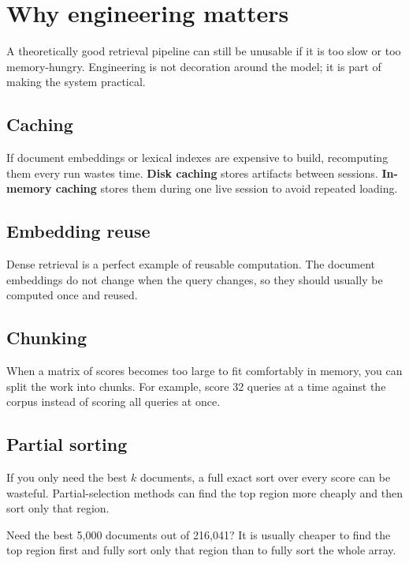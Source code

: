 \documentclass[11pt,oneside]{report}
\newcommand{\term}[1]{\textbf{#1}}
\begin{document}
\chapter[Why Engineering Matters]{Why engineering matters}

\begin{purposebox}
A theoretically good retrieval pipeline can still be unusable if it is too slow or too memory-hungry. Engineering is not decoration around the model; it is part of making the system practical.
\end{purposebox}

\section*{Caching}
If document embeddings or lexical indexes are expensive to build, recomputing them every run wastes time. \term{Disk caching} stores artifacts between sessions. \term{In-memory caching} stores them during one live session to avoid repeated loading.

\section*{Embedding reuse}
Dense retrieval is a perfect example of reusable computation. The document embeddings do not change when the query changes, so they should usually be computed once and reused.

\section*{Chunking}
When a matrix of scores becomes too large to fit comfortably in memory, you can split the work into chunks. For example, score 32 queries at a time against the corpus instead of scoring all queries at once.

\section*{Partial sorting}
If you only need the best $k$ documents, a full exact sort over every score can be wasteful. Partial-selection methods can find the top region more cheaply and then sort only that region.

\begin{examplebox}
Need the best 5{,}000 documents out of 216{,}041? It is usually cheaper to find the top region first and fully sort only that region than to fully sort the whole array.
\end{examplebox}
\end{document}
